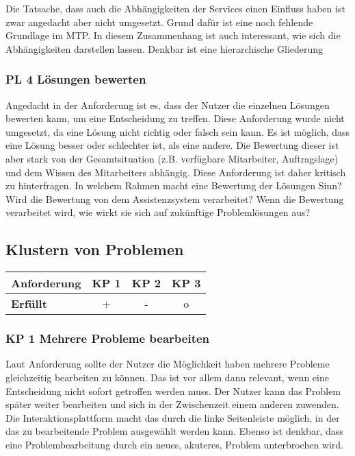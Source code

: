 Die Tatsache, dass auch die Abhängigkeiten der Services einen Einfluss haben ist zwar angedacht aber nicht umgesetzt. Grund dafür ist eine noch fehlende Grundlage im MTP. In diesem Zusammenhang ist auch interessant, wie sich die Abhängigkeiten darstellen lassen. Denkbar ist eine hierarchische Gliederung 

\subsubsection*{PL 4 Lösungen bewerten}
Angedacht in der Anforderung ist es, dass der Nutzer die einzelnen Lösungen bewerten kann, um eine Entscheidung zu treffen. Diese Anforderung wurde nicht umgesetzt, da eine Lösung nicht richtig oder falsch sein kann. Es ist möglich, dass eine Lösung besser oder schlechter ist, als eine andere. Die Bewertung dieser ist aber stark von der Gesamtsituation (z.B. verfügbare Mitarbeiter, Auftragslage) und dem Wissen des Mitarbeiters abhängig. Diese Anforderung ist daher kritisch zu hinterfragen. In welchem Rahmen macht eine Bewertung der Lösungen Sinn? Wird die Bewertung von dem Assistenzsystem verarbeitet? Wenn die Bewertung verarbeitet wird, wie wirkt sie sich auf zukünftige Problemlösungen aus?

\subsection{Klustern von Problemen}
\begin{table}[htbp]
\centering
\begin{tabular}{l|c|c|c}
\textbf{Anforderung} & KP 1 & KP 2 & KP 3\\
\hline
\textbf{Erfüllt} & + & - & o\\
\end{tabular}
\end{table}

\subsubsection*{KP 1 Mehrere Probleme bearbeiten}
Laut Anforderung sollte der Nutzer die Möglichkeit haben mehrere Probleme gleichzeitig bearbeiten zu können. Das ist vor allem dann relevant, wenn eine Entscheidung nicht sofort getroffen werden muss. Der Nutzer kann das Problem später weiter bearbeiten und sich in der Zwischenzeit einem anderen zuwenden. Die Interaktionsplattform macht das durch die linke Seitenleiste möglich, in der das zu bearbeitende Problem ausgewählt werden kann. Ebenso ist denkbar, dass eine Problembearbeitung durch ein neues, akuteres, Problem unterbrochen wird.

